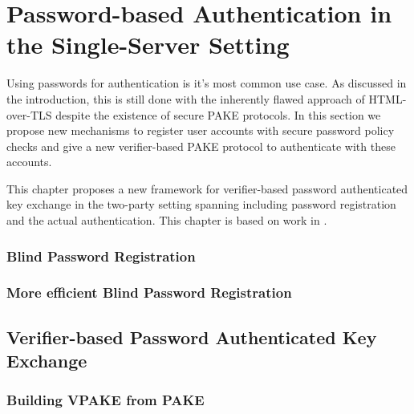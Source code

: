 \chapter{Password-based Authentication in the Single-Server Setting} \label{ch:vpake}
Using passwords for authentication is it's most common use case.
As discussed in the introduction, this is still done with the inherently flawed approach of \ac{HTML}-over-\ac{TLS} despite the existence of secure \ac{PAKE} protocols.
In this section we propose new mechanisms to register user accounts with secure password policy checks and give a new verifier-based \ac{PAKE} protocol to authenticate with these accounts.

This chapter proposes a new framework for verifier-based password authenticated key exchange in the two-party setting spanning including password registration and the actual authentication.
This chapter is based on work in \cite{Kiefer13a,Kiefer2012,KieferM14b,KieferM15a,DongK15a,ManulisSKD15a}.






\subsection{Blind Password Registration}

\subsection{More efficient Blind Password Registration}

\section{Verifier-based Password Authenticated Key Exchange} \label{sec:vpake-pake}

\subsection{Building VPAKE from PAKE}

